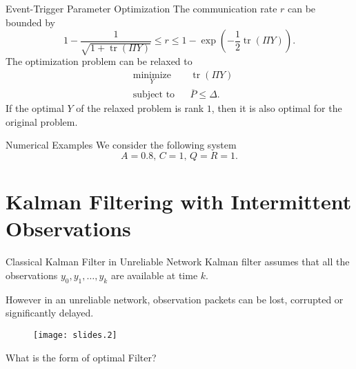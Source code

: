\documentclass[10pt]{beamer}
\newlength\figureheight
\newlength\figurewidth
\newcommand{\tikzdir}[1]{#1.tikz}
\newcommand{\inputtikz}[1]{}}
\DeclareMathOperator{\tr}{tr}
\begin{document}
  \begin{frame}{Event-Trigger Parameter Optimization}
    The communication rate $r$ can be bounded by
    \begin{displaymath}
      1-\frac{1}{\sqrt{1+\tr(\Pi Y)}} \leq  r \leq 1-\exp\left(-\frac{1}{2}\tr(\Pi Y)\right).
    \end{displaymath}
    The optimization problem can be relaxed to
    \begin{align*}
      &\mathop{\textrm{minimize}}\limits_{Y}&
      & \tr(\Pi Y)\nonumber\\
      &\textrm{subject to}&
      & \overline P\leq \Delta.
    \end{align*}
    If the optimal $Y$ of the relaxed problem is rank $1$, then it is also optimal for the original problem.
  \end{frame}

  \begin{frame}{Numerical Examples}
    We consider the following system
    \begin{displaymath}
     A = 0.8,\,C = 1,\, Q = R = 1. 
    \end{displaymath}
	\setlength\figureheight{5cm}
	\setlength\figurewidth{8cm}
    \begin{center}
      \inputtikz{eventbased}
    \end{center}
  \end{frame}



  \section{Kalman Filtering with Intermittent Observations}
  \frame{\tableofcontents[currentsection]}

  \begin{frame}{Classical Kalman Filter in Unreliable Network}
    Kalman filter assumes that all the observations $y_0,y_1,\ldots,y_k$ are available at time $k$.

    However in an unreliable network, observation packets can be lost, corrupted or significantly delayed.
    \begin{figure}[<h>]
      \begin{center}
	\texttt{[image: slides.2]}
      \end{center}
    \end{figure}
    What is the form of optimal Filter? 
  \end{frame}
\end{document}
